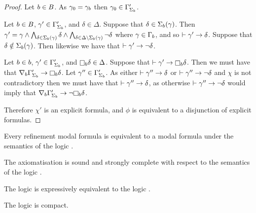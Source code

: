 \begin{proof}
Let $b \in B$.
As $\gamma_0 = \gamma_b$ then $\gamma_0 \in \Gamma'_{\Sigma_b}$.

Let $b \in B$, $\gamma' \in \Gamma'_{\Sigma_b}$, and $\delta \in \Delta$.
Suppose that $\delta \in \Sigma_b(\gamma)$.
Then $\gamma' = \gamma \land \bigwedge_{\delta \in \Sigma_b(\gamma)} \delta \land \bigwedge_{\delta \in \Delta \setminus \Sigma_b(\gamma)} \neg \delta$  where $\gamma \in \Gamma_b$, and so $\vdash \gamma' \rightarrow \delta$.
Suppose that $\delta \notin \Sigma_b(\gamma)$.
Then likewise we have that $\vdash \gamma' \rightarrow \neg \delta$.

Let $b \in b$, $\gamma' \in \Gamma'_{\Sigma_b}$, and $\necessaryB \delta \in \Delta$.
Suppose that $\proves \gamma' \implies \necessaryB \delta$.
Then we must have that $\coversB \Gamma'_{\Sigma_\agentB} \implies \necessaryB \delta$.
Let $\gamma'' \in \Gamma'_{\Sigma_b}$.
As either $\vdash \gamma'' \rightarrow \delta$ or $\vdash \gamma'' \rightarrow \neg \delta$ and $\chi$ is not contradictory then we must have that $\vdash \gamma'' \rightarrow \delta$, as otherwise $\vdash \gamma'' \rightarrow \neg \delta$ would imply that $\coversB \Gamma'_{\Sigma_\agentB} \implies \neg \necessaryB \delta$.

Therefore $\chi'$ is an explicit formula, and $\phi$ is equivalent to a disjunction of explicit formulas.
\end{proof}

\begin{lemma}
Every refinement modal formula is equivalent to a modal formula under the semantics of the logic \logicRmlS{}.
\end{lemma}


\begin{theorem}
The axiomatisation \axiomRmlS{} is sound and strongly complete with respect to the semantics of the logic \logicRmlS{}.
\end{theorem}


\begin{corollary}
The logic \logicRmlS{} is expressively equivalent to the logic \logicS{}.
\end{corollary}

\begin{corollary}
The logic \logicRmlS{} is compact.
\end{corollary}

